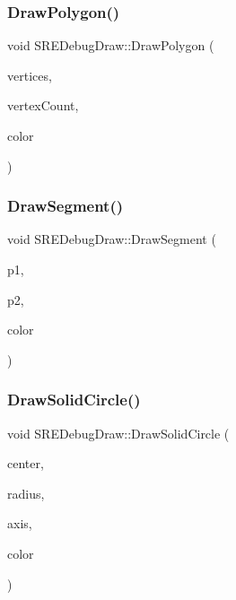 \subsubsection{\texorpdfstring{Draw\+Polygon()}{DrawPolygon()}}
{\footnotesize\ttfamily void S\+R\+E\+Debug\+Draw\+::\+Draw\+Polygon (\begin{DoxyParamCaption}\item[{const b2\+Vec2 $\ast$}]{vertices,  }\item[{int32}]{vertex\+Count,  }\item[{const b2\+Color \&}]{color }\end{DoxyParamCaption})}

\hypertarget{class_mason_1_1_s_r_e_debug_draw_ae52016e6134930d09f6f8a07308cc9e7}{}\label{class_mason_1_1_s_r_e_debug_draw_ae52016e6134930d09f6f8a07308cc9e7} 
\subsubsection{\texorpdfstring{Draw\+Segment()}{DrawSegment()}}
{\footnotesize\ttfamily void S\+R\+E\+Debug\+Draw\+::\+Draw\+Segment (\begin{DoxyParamCaption}\item[{const b2\+Vec2 \&}]{p1,  }\item[{const b2\+Vec2 \&}]{p2,  }\item[{const b2\+Color \&}]{color }\end{DoxyParamCaption})}

\hypertarget{class_mason_1_1_s_r_e_debug_draw_a9392357bb882d28ca0a86f179901488b}{}\label{class_mason_1_1_s_r_e_debug_draw_a9392357bb882d28ca0a86f179901488b} 
\subsubsection{\texorpdfstring{Draw\+Solid\+Circle()}{DrawSolidCircle()}}
{\footnotesize\ttfamily void S\+R\+E\+Debug\+Draw\+::\+Draw\+Solid\+Circle (\begin{DoxyParamCaption}\item[{const b2\+Vec2 \&}]{center,  }\item[{float32}]{radius,  }\item[{const b2\+Vec2 \&}]{axis,  }\item[{const b2\+Color \&}]{color }\end{DoxyParamCaption})}

